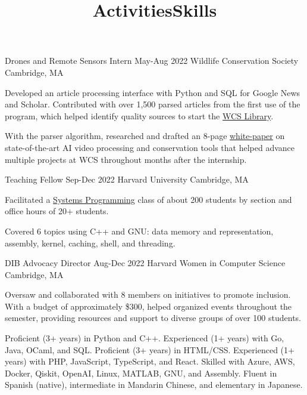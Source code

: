 \documentclass[11pt]{article}
\begin{document}
    \job
    {Drones and Remote Sensors Intern}
    {May-Aug 2022}
    {Wildlife Conservation Society}
    {Cambridge, MA}
    {
      \item Developed an article processing interface with Python and SQL for Google News and Scholar. Contributed with over 1,500 parsed articles from the first use of the program, which helped identify quality sources to start the \href{https://library.wcs.org}{WCS Library}.
      \item With the parser algorithm, researched and drafted an 8-page \href{https://bit.ly/AI-Advancing-Video-Processing-and-CTDS}{white-paper} on state-of-the-art AI video processing and conservation tools that helped advance multiple projects at WCS throughout months after the internship.
    }
  
  \title{Activities}
    \job
    {Teaching Fellow}
    {Sep-Dec 2022}
    {Harvard University}
    {Cambridge, MA}
    {
      \item Facilitated a \href{https://cs61.seas.harvard.edu/site/2022}{Systems Programming} class 
      of about 200 students by section and office hours of 20+ students.
      \item Covered 6 topics using C++ and GNU: data memory and representation, assembly, kernel, caching, shell, and threading.
    }

    \job
    {DIB Advocacy Director}
    {Aug-Dec 2022}
    {Harvard Women in Computer Science}
    {Cambridge, MA}
    {
      \item Oversaw and collaborated with 8 members on initiatives to promote inclusion. With a budget of approximately \$300, helped organized events throughout the semester, providing resources and support to diverse groups of over 100 students.
    }

  \title{Skills}
  \skills
    {Proficient (3+ years) in Python and C++. Experienced (1+ years) with Go, Java, OCaml, and SQL.}
    {Proficient (3+ years) in HTML/CSS. Experienced (1+ years) with PHP, JavaScript, TypeScript, and React.}
    {Skilled with Azure, AWS, Docker, Qiskit, OpenAI, Linux, MATLAB, GNU, and Assembly.}
    {Fluent in Spanish (native), intermediate in Mandarin Chinese, and elementary in Japanese.}
\end{document}
